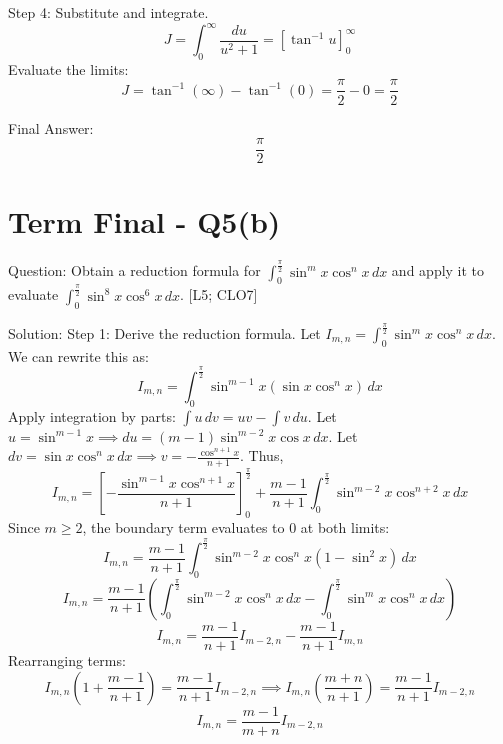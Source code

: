 \documentclass[11pt, a4paper]{article}
\begin{document}
Step 4: Substitute and integrate.
\[
J = \int_{0}^{\infty} \frac{du}{u^2 + 1} = \left[ \tan^{-1} u \right]_{0}^{\infty}
\]
Evaluate the limits:
\[
J = \tan^{-1}(\infty) - \tan^{-1}(0) = \frac{\pi}{2} - 0 = \frac{\pi}{2}
\]

Final Answer:
\[
\boxed{\frac{\pi}{2}}
\]





\section*{Term Final - Q5(b)}

Question:
Obtain a reduction formula for $\int_{0}^{\frac{\pi}{2}} \sin^m x \cos^n x \, dx$ and apply it to evaluate $\int_{0}^{\frac{\pi}{2}} \sin^8 x \cos^6 x \, dx$. [L5; CLO7]

Solution:
Step 1: Derive the reduction formula.
Let $I_{m, n} = \int_{0}^{\frac{\pi}{2}} \sin^m x \cos^n x \, dx$. We can rewrite this as:
\[
I_{m, n} = \int_{0}^{\frac{\pi}{2}} \sin^{m-1} x (\sin x \cos^n x) \, dx
\]
Apply integration by parts: $\int u \, dv = uv - \int v \, du$.
Let $u = \sin^{m-1} x \implies du = (m-1)\sin^{m-2} x \cos x \, dx$.
Let $dv = \sin x \cos^n x \, dx \implies v = -\frac{\cos^{n+1} x}{n+1}$.
Thus,
\[
I_{m, n} = \left[ -\frac{\sin^{m-1} x \cos^{n+1} x}{n+1} \right]_{0}^{\frac{\pi}{2}} + \frac{m-1}{n+1} \int_{0}^{\frac{\pi}{2}} \sin^{m-2} x \cos^{n+2} x \, dx
\]
Since $m \ge 2$, the boundary term evaluates to $0$ at both limits:
\[
I_{m, n} = \frac{m-1}{n+1} \int_{0}^{\frac{\pi}{2}} \sin^{m-2} x \cos^n x (1 - \sin^2 x) \, dx
\]
\[
I_{m, n} = \frac{m-1}{n+1} \left( \int_{0}^{\frac{\pi}{2}} \sin^{m-2} x \cos^n x \, dx - \int_{0}^{\frac{\pi}{2}} \sin^m x \cos^n x \, dx \right)
\]
\[
I_{m, n} = \frac{m-1}{n+1} I_{m-2, n} - \frac{m-1}{n+1} I_{m, n}
\]
Rearranging terms:
\[
I_{m, n} \left( 1 + \frac{m-1}{n+1} \right) = \frac{m-1}{n+1} I_{m-2, n} \implies I_{m, n} \left( \frac{m+n}{n+1} \right) = \frac{m-1}{n+1} I_{m-2, n}
\]
\[
I_{m, n} = \frac{m-1}{m+n} I_{m-2, n}
\]
\end{document}
